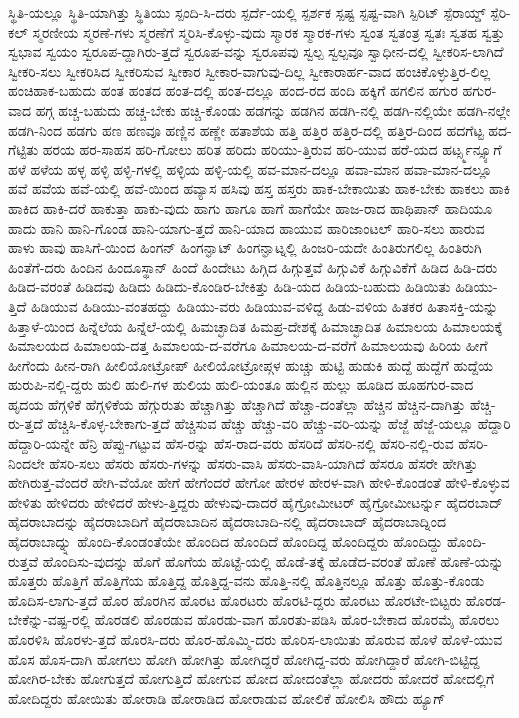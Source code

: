 {ಸ್ಥಿತಿ-ಯಲ್ಲೂ
ಸ್ಥಿತಿ-ಯಾಗಿತ್ತು
ಸ್ಥಿತಿಯು
ಸ್ಪಂದಿ-ಸಿ-ದರು
ಸ್ಪರ್ದೆ-ಯಲ್ಲಿ
ಸ್ಪರ್ಶಕ
ಸ್ಪಷ್ಟ
ಸ್ಪಷ್ಟ-ವಾಗಿ
ಸ್ಪಿರಿಟ್
ಸ್ಪೆರಾಯ್ಡ್
ಸ್ಪೆರಿ-ಕಲ್
ಸ್ಮರಣೀಯ
ಸ್ಮರಣೆ-ಗಳು
ಸ್ಮರಣೆಗೆ
ಸ್ಮರಿಸಿ-ಕೊಳ್ಳು-ವುದು
ಸ್ಮಾರಕ
ಸ್ಮಾರಕ-ಗಳು
ಸ್ವಂತ
ಸ್ವತಂತ್ರ
ಸ್ವತಃ
ಸ್ವತಹ
ಸ್ವತ್ತು
ಸ್ವಭಾವ
ಸ್ವಯಂ
ಸ್ವರೂಪ-ದ್ದಾಗಿರು-ತ್ತದೆ
ಸ್ವರೂಪ-ವನ್ನು
ಸ್ವರೂಪವು
ಸ್ವಲ್ಪ
ಸ್ವಲ್ಪವೂ
ಸ್ವಾಧೀನ-ದಲ್ಲಿ
ಸ್ವೀಕರಿಸ-ಲಾಗಿದೆ
ಸ್ವೀಕರಿ-ಸಲು
ಸ್ವೀಕರಿಸಿದ
ಸ್ವೀಕರಿಸುವ
ಸ್ವೀಕಾರ
ಸ್ವೀಕಾರ-ವಾಗುವು-ದಿಲ್ಲ
ಸ್ವೀಕಾರಾರ್ಹ-ವಾದ
ಹಂಚಿಕೊಳ್ಳುತ್ತಿರ-ಲಿಲ್ಲ
ಹಂಚಿಹಾಕ-ಬಹುದು
ಹಂತ
ಹಂತದ
ಹಂತ-ದಲ್ಲಿ
ಹಂತ-ದಲ್ಲೂ
ಹಂದ-ರದ
ಹಂದಿ
ಹಕ್ಕಿಗೆ
ಹಗಲಿನ
ಹಗುರ
ಹಗುರ-ವಾದ
ಹಗ್ಗ
ಹಚ್ಚ-ಬಹುದು
ಹಚ್ಚ-ಬೇಕು
ಹಚ್ಚಿ-ಕೊಂಡು
ಹಡಗನ್ನು
ಹಡಗಿನ
ಹಡಗಿ-ನಲ್ಲಿ
ಹಡಗಿ-ನಲ್ಲಿಯೇ
ಹಡಗಿ-ನಲ್ಲೇ
ಹಡಗಿ-ನಿಂದ
ಹಡಗು
ಹಣ
ಹಣವೂ
ಹಣ್ಣಿನ
ಹಣ್ಣೇ
ಹತಾಶೆಯ
ಹತ್ತಿ
ಹತ್ತಿರ
ಹತ್ತಿರ-ದಲ್ಲಿ
ಹತ್ತಿರ-ದಿಂದ
ಹದಗೆಟ್ಟ
ಹದ-ಗೆಟ್ಟಿತು
ಹರಯ
ಹರ-ಸಾಹಸ
ಹರಿ-ಗೋಲು
ಹರಿತ
ಹರಿದು
ಹರಿಯು-ತ್ತಿರುವ
ಹರಿ-ಯುವ
ಹರೆ-ಯದ
ಹರ್ಟ್ಸ್ಮನ್ಸ್ಯೂಗೆ
ಹಳೆ
ಹಳೆಯ
ಹಳ್ಳ
ಹಳ್ಳಿ
ಹಳ್ಳಿ-ಗಳಲ್ಲಿ
ಹಳ್ಳಿಯ
ಹಳ್ಳಿ-ಯಲ್ಲಿ
ಹವ-ಮಾನ-ದಲ್ಲೂ
ಹವಾ-ಮಾನ
ಹವಾ-ಮಾನ-ದಲ್ಲೂ
ಹವೆ
ಹವೆಯ
ಹವೆ-ಯಲ್ಲಿ
ಹವೆ-ಯಿಂದ
ಹವ್ಯಾಸ
ಹಸಿವು
ಹಸ್ತ
ಹಸ್ತರು
ಹಾಕ-ಬೇಕಾಯಿತು
ಹಾಕ-ಬೇಕು
ಹಾಕಲು
ಹಾಕಿ
ಹಾಕಿದ
ಹಾಕಿ-ದರೆ
ಹಾಕುತ್ತಾ
ಹಾಕು-ವುದು
ಹಾಗು
ಹಾಗೂ
ಹಾಗೆ
ಹಾಗೆಯೇ
ಹಾಜ-ರಾದ
ಹಾಥಿಪಾನ್
ಹಾದಿಯೂ
ಹಾದು
ಹಾನಿ
ಹಾನಿ-ಗೊಂಡ
ಹಾನಿ-ಯಾಗು-ತ್ತದೆ
ಹಾನಿ-ಯಾದ
ಹಾಯುವ
ಹಾರಿಜಾಂಟಲ್
ಹಾರಿ-ಸಲು
ಹಾರುವ
ಹಾಳು
ಹಾವು
ಹಾಸಿಗೆ-ಯಿಂದ
ಹಿಂಗನ್
ಹಿಂಗನ್ಘಾಟ್
ಹಿಂಗನ್ಘಾಟ್ನಲ್ಲಿ
ಹಿಂಜರಿ-ಯದೇ
ಹಿಂತಿರುಗಲಿಲ್ಲ
ಹಿಂತಿರುಗಿ
ಹಿಂತೆಗೆ-ದರು
ಹಿಂದಿನ
ಹಿಂದೂಸ್ಥಾನ್
ಹಿಂದೆ
ಹಿಂದೇಟು
ಹಿಗ್ಗಿದ
ಹಿಗ್ಗುತ್ತವೆ
ಹಿಗ್ಗುವಿಕೆ
ಹಿಗ್ಗುವಿಕೆಗೆ
ಹಿಡಿದ
ಹಿಡಿ-ದರು
ಹಿಡಿದ-ವರಂತೆ
ಹಿಡಿದವು
ಹಿಡಿದು
ಹಿಡಿದು-ಕೊಂಡಿರ-ಬೇಕಿತ್ತು
ಹಿಡಿ-ಯದ
ಹಿಡಿಯ-ಬಹುದು
ಹಿಡಿಯಿತು
ಹಿಡಿಯು-ತ್ತಿದೆ
ಹಿಡಿಯುವ
ಹಿಡಿಯು-ವಂತಹದ್ದು
ಹಿಡಿಯು-ವರು
ಹಿಡಿಯುವ-ವಳಿದ್ದ
ಹಿಡು-ವಳಿಯ
ಹಿತಕರ
ಹಿತಾಸಕ್ತಿ-ಯನ್ನು
ಹಿತ್ತಾಳೆ-ಯಿಂದ
ಹಿನ್ನೆಲೆಯ
ಹಿನ್ನೆಲೆ-ಯಲ್ಲಿ
ಹಿಮಚ್ಛಾದಿತ
ಹಿಮಪ್ರ-ದೇಶಕ್ಕೆ
ಹಿಮಾಚ್ಛಾದಿತ
ಹಿಮಾಲಯ
ಹಿಮಾಲಯಕ್ಕೆ
ಹಿಮಾಲಯದ
ಹಿಮಾಲಯ-ದತ್ತ
ಹಿಮಾಲಯ-ದ-ವರೆಗೂ
ಹಿಮಾಲಯ-ದ-ವರೆಗೆ
ಹಿಮಾಲಯವು
ಹಿರಿಯ
ಹೀಗೆ
ಹೀಗೆಂದು
ಹೀನ-ರಾಗಿ
ಹೀಲಿಯೋಟ್ರೋಪ್
ಹೀಲಿಯೋಟ್ರೋಪ್ಗಳ
ಹುಚ್ಚು
ಹುಟ್ಟಿ
ಹುಡುಕಿ
ಹುದ್ದೆ
ಹುದ್ದೆಗೆ
ಹುದ್ದೆಯ
ಹುರುಪಿ-ನಲ್ಲಿ-ದ್ದರು
ಹುಲಿ
ಹುಲಿ-ಗಳ
ಹುಲಿಯ
ಹುಲಿ-ಯಂತೂ
ಹುಲ್ಲಿನ
ಹುಲ್ಲು
ಹೂಡಿದ
ಹೂಹಗುರ-ವಾದ
ಹೃದಯ
ಹೆಗ್ಗಳಿಕೆ
ಹೆಗ್ಗಳಿಕೆಯ
ಹೆಗ್ಗುರುತು
ಹೆಚ್ಚಾಗಿತ್ತು
ಹೆಚ್ಚಾಗಿದೆ
ಹೆಚ್ಚಾ-ದಂತೆಲ್ಲಾ
ಹೆಚ್ಚಿನ
ಹೆಚ್ಚಿನ-ದಾಗಿತ್ತು
ಹೆಚ್ಚಿ-ರು-ತ್ತದೆ
ಹೆಚ್ಚಿಸಿ-ಕೊಳ್ಳ-ಬೇಕಾಗು-ತ್ತದೆ
ಹೆಚ್ಚಿಸುವ
ಹೆಚ್ಚು
ಹೆಚ್ಚು-ವರಿ
ಹೆಚ್ಚು-ವರಿ-ಯನ್ನು
ಹೆಜ್ಜೆ
ಹೆಜ್ಜೆ-ಯಲ್ಲೂ
ಹೆದ್ದಾರಿ
ಹೆದ್ದಾರಿ-ಯನ್ನೇ
ಹೆನ್ರಿ
ಹೆಪ್ಪು-ಗಟ್ಟುವ
ಹೆಸ-ರನ್ನು
ಹೆಸ-ರಾದ-ವರು
ಹೆಸರಿದೆ
ಹೆಸರಿ-ನಲ್ಲಿ
ಹೆಸರಿ-ನಲ್ಲಿ-ರುವ
ಹೆಸರಿ-ನಿಂದಲೇ
ಹೆಸರಿ-ಸಲು
ಹೆಸರು
ಹೆಸರು-ಗಳನ್ನು
ಹೆಸರು-ವಾಸಿ
ಹೆಸರು-ವಾಸಿ-ಯಾಗಿದೆ
ಹೆಸರೂ
ಹೆಸರೇ
ಹೇಗಿತ್ತು
ಹೇಗಿರುತ್ತ-ವೆಂದರೆ
ಹೇಗಿ-ವೆಯೋ
ಹೇಗೆ
ಹೇಗೆಂದರೆ
ಹೇಗೋ
ಹೇರಳ
ಹೇರಳ-ವಾಗಿ
ಹೇಳಿ-ಕೊಂಡಂತೆ
ಹೇಳಿ-ಕೊಳ್ಳುವ
ಹೇಳಿತು
ಹೇಳಿದರು
ಹೇಳಿದರೆ
ಹೇಳು-ತ್ತಿದ್ದರು
ಹೇಳುವು-ದಾದರೆ
ಹೈಗ್ರೋಮೀಟರ್
ಹೈಗ್ರೋಮೀಟರ್ನ್ನು
ಹೈದರಬಾದ್
ಹೈದರಾಬಾದನ್ನು
ಹೈದರಾಬಾದಿಗೆ
ಹೈದರಾಬಾದಿನ
ಹೈದರಾಬಾದಿ-ನಲ್ಲಿ
ಹೈದರಾಬಾದ್
ಹೈದರಾಬಾದ್ನಿಂದ
ಹೈದರಾಬಾದ್ನ್ನು
ಹೊಂದಿ-ಕೊಂಡಂತೆಯೇ
ಹೊಂದಿದ
ಹೊಂದಿದೆ
ಹೊಂದಿದ್ದ
ಹೊಂದಿದ್ದರು
ಹೊಂದಿದ್ದು
ಹೊಂದಿ-ರುತ್ತವೆ
ಹೊಂದಿಸು-ವುದನ್ನು
ಹೊಗೆ
ಹೊಗೆಯ
ಹೊಟ್ಟೆ-ಯಲ್ಲಿ
ಹೊಡೆ-ತಕ್ಕೆ
ಹೊಡೆದ-ವರಂತೆ
ಹೊಣೆ
ಹೊಣೆ-ಯನ್ನು
ಹೊತ್ತರು
ಹೊತ್ತಿಗೆ
ಹೊತ್ತಿಗೆಯ
ಹೊತ್ತಿದ್ದ
ಹೊತ್ತಿದ್ದ-ವನು
ಹೊತ್ತಿ-ನಲ್ಲಿ
ಹೊತ್ತಿನಲ್ಲೂ
ಹೊತ್ತು
ಹೊತ್ತು-ಕೊಂಡು
ಹೊದಿಸ-ಲಾಗು-ತ್ತದೆ
ಹೊರ
ಹೊರಗಿನ
ಹೊರಟ
ಹೊರಟರು
ಹೊರಟಿ-ದ್ದರು
ಹೊರಟು
ಹೊರಟೇ-ಬಿಟ್ಟರು
ಹೊರಡ-ಬೇಕೆನ್ನು-ವಷ್ಟ-ರಲ್ಲಿ
ಹೊರಡಲಿ
ಹೊರಡುವ
ಹೊರಡು-ವಾಗ
ಹೊರತು-ಪಡಿಸಿ
ಹೊರ-ಬೇಕಾದ
ಹೊರಮೈ
ಹೊರಲು
ಹೊರಳಿಸಿ
ಹೊರಳು-ತ್ತದೆ
ಹೊರಸಿ-ದರು
ಹೊರ-ಹೊಮ್ಮಿ-ದರು
ಹೊರಿಸ-ಲಾಯಿತು
ಹೊರುವ
ಹೊಳೆ
ಹೊಳೆ-ಯುವ
ಹೊಸ
ಹೊಸ-ದಾಗಿ
ಹೋಗಲು
ಹೋಗಿ
ಹೋಗಿತ್ತು
ಹೋಗಿದ್ದರೆ
ಹೋಗಿದ್ದ-ವರು
ಹೋಗಿದ್ದಾರೆ
ಹೋಗಿ-ಬಿಟ್ಟಿದ್ದ
ಹೋಗಿರ-ಬೇಕು
ಹೋಗುತ್ತದೆ
ಹೋಗುತ್ತಿದೆ
ಹೋಗುವ
ಹೋದ
ಹೋದಂತೆಲ್ಲಾ
ಹೋದರು
ಹೋದರೆ
ಹೋದಲ್ಲಿಗೆ
ಹೋದಿದ್ದರು
ಹೋಯಿತು
ಹೋರಾಡಿ
ಹೋರಾಡಿದ
ಹೋರಾಡುವ
ಹೋಲಿಕೆ
ಹೋಲಿಸಿ
ಹೌದು
ಹ್ಯೂಗ್
}
